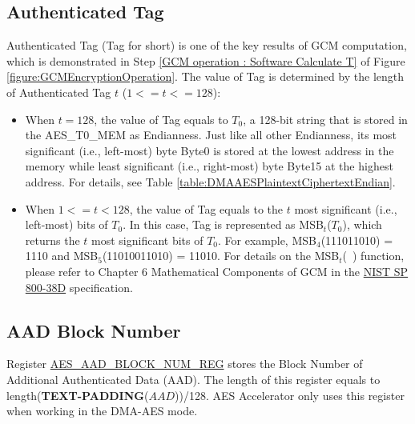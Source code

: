 \documentclass[main\_\_EN.tex]{subfiles}
\begin{document}
\subsection{Authenticated Tag}\label{Label Authenticated Tag}

Authenticated Tag (Tag for short) is one of the key results of GCM computation, which is demonstrated in Step \ref{GCM operation : Software Calculate T} of Figure \ref{figure:GCMEncryptionOperation}. The value of Tag is determined by the length of Authenticated Tag $t$ ($1 <= t <= 128$):

\begin{itemize}
    \item When $t = 128$, the value of Tag equals to $T_0$, a 128-bit string that is stored in the AES\_T0\_MEM as Endianness\label{memdesc:AEST0MEM}. Just like all other Endianness, its most significant (i.e., left-most) byte Byte0 is stored at the lowest address in the memory while least significant (i.e., right-most) byte Byte15 at the highest address. For details, see Table \ref{table:DMAAESPlaintextCiphertextEndian}.

    \item When $1 <= t < 128$, the value of Tag equals to the $t$ most significant (i.e., left-most) bits of $T_0$. In this case, Tag is represented as MSB$_t$($T_0$), which returns the $t$ most significant bits of $T_0$. For example, MSB$_4$(111011010) = 1110 and MSB$_5$(11010011010) = 11010. For details on the MSB$_t$(\ ) function, please refer to Chapter 6 Mathematical Components of GCM in the \href{https://nvlpubs.nist.gov/nistpubs/Legacy/SP/nistspecialpublication800-38d.pdf}{NIST SP 800-38D} specification.
\end{itemize}

\subsection{ AAD Block Number }\label{Label AAD Block Number}

Register \hyperref[regdesc:AESAADBLOCKNUMREG]{AES\_AAD\_BLOCK\_NUM\_REG} stores the Block Number of Additional Authenticated Data (AAD). The length of this register equals to length({\bfseries TEXT-PADDING}($AAD$))/128. AES Accelerator only uses this register when working in the DMA-AES mode.
\end{document}
